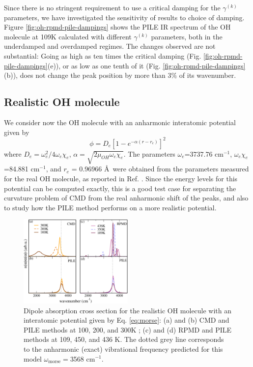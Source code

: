 \documentclass[aps,prb,superscriptaddress,amsmath,amssymb,showpacs,twocolumn]{revtex4}
\begin{document}
Since there is no stringent requirement to use a critical damping for the 
$\gamma^{(k)}$ parameters, we have investigated the sensitivity of 
results to choice of damping. Figure \ref{fig:oh-rpmd-pile-dampings} 
shows the PILE IR spectrum of the OH molecule at 109K calculated with different
$\gamma^{(k)}$ parameters, both in the underdamped and overdamped regimes. 
The changes observed are not substantial: Going as high as ten times the critical 
damping (Fig. \ref{fig:oh-rpmd-pile-dampings}(e)), or as low
as one tenth of it (Fig. \ref{fig:oh-rpmd-pile-dampings}(b)), does not change 
the peak position by more than 3\% of its wavenumber. 


\subsection{Realistic OH molecule}


We consider now the OH molecule 
with an anharmonic interatomic potential given by
%
\begin{equation}
\phi = D_{e} \left[ 1-e^{-\alpha(r-r_{e})}\right]^2 
\label{eq:morse}
\end{equation}
%
 where $D_{e} = \omega_e^2/4\omega_e\chi_e$, $\alpha=\sqrt{2\mu_{OH}\omega_e\chi_e}$. The 
parameters $\omega_e$=3737.76 cm$^{-1}$, $\omega_e \chi_e$=84.881 cm$^{-1}$, and $r_{e}$ = 0.96966 \AA\, 
were obtained from the parameters measured for the real OH molecule, as reported in Ref. \cite{HerzbergBook}.
Since the energy levels for this potential can be computed exactly, this is a good test case for 
separating the curvature problem of CMD from the real anharmonic shift of the peaks, 
and also to study how the PILE method performs on a more realistic potential.

\begin{figure}[htbp]
\centering
\includegraphics[width=0.5\textwidth]{figures/comparison_ohanharm_factors.pdf}
\caption{Dipole absorption cross section for the realistic OH molecule with an interatomic 
potential given by Eq. \ref{eq:morse}: (a) and (b) CMD and PILE methods at 100, 200, 
and 300K ; (c)  and (d) RPMD and PILE methods at 109, 450, and 436 K. The dotted grey line corresponds to the 
anharmonic (exact) vibrational frequency predicted for this model $\omega_\text{morse}=$3568 cm$^{-1}$.}
\label{fig:ohreal-rpmd-cmd-pile}
\end{figure}
\end{document}
